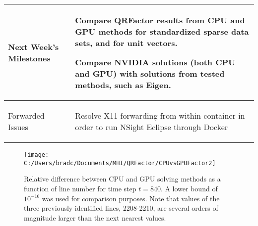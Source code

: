 \documentclass[11pt,letterpaper]{article}
\begin{document}
\begin{tabular}{| p{} | p{} |}
	Next Week's \newline Milestones & \begin{enumerate*}
	\item[\tiny\textbullet] Compare QRFactor results from CPU and GPU methods for standardized sparse data sets, and for unit vectors. \newline
  \item[\tiny\textbullet] Compare NVIDIA solutions (both CPU and GPU) with solutions from tested methods, such as Eigen.
	\end{enumerate*} \\ \hline

	Forwarded Issues & \begin{enumerate*}
	\item[\tiny\textbullet] \item[\tiny\textbullet] Resolve X11 forwarding from within container in order to run NSight Eclipse through Docker
	\end{enumerate*} \\ \hline
\end{tabular}

\begin{figure}[h]
  \centering
  \texttt{[image: C:/Users/bradc/Documents/MHI/QRFactor/CPUvsGPUFactor2]}
  \caption{Relative difference between CPU and GPU solving methods as a function of line number for time step $t = 840$. A lower bound of $10^{-16}$ was used for comparison purposes. Note that values of the three previously identified lines, 2208-2210, are several orders of magnitude larger than the next nearest values.}
  \label{fig: rel diff}
\end{figure}
\end{document}
